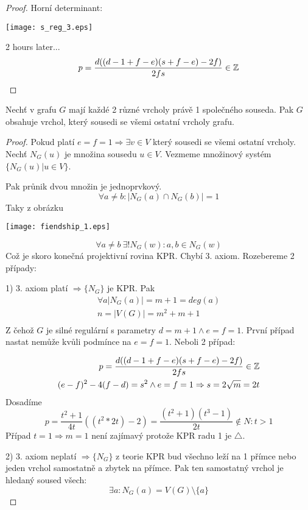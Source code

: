 \begin{proof}
	Horní determinant:

	\texttt{[image: s\_reg\_3.eps]}

	2 hours later...
	\[ p = \frac{d((d - 1 + f - e)(s + f - e) - 2f)}{2fs} \in \operatorname{\mathbb{Z}} \]
\end{proof}

\begin{theorem}
	Nechť v grafu $G$ mají každé 2 různé vrcholy právě 1 společného souseda.
	Pak $G$ obsahuje vrchol, který sousedi se všemi ostatní vrcholy grafu.
\end{theorem}
\begin{proof}
	Pokud platí $ e = f = 1 \Rightarrow \exists v \in V$ který sousedi se všemi ostatní vrcholy. \\
	Nechť $N_G(u)$ je množina sousedu $u \in V$. Vezmeme množinový systém $\{ N_G(u) | u \in V \}$.

	Pak průnik dvou množin je jednoprvkový.
	\[ \forall a \ne b: |N_G(a) \cap N_G(b)| = 1 \]
	Taky z obrázku

	\texttt{[image: fiendship\_1.eps]}

	\[ \forall a \ne b\ \exists! N_G(w): a,b \in N_G(w) \]
	Což je skoro konečná projektivní rovina KPR. Chybí 3. axiom. Rozebereme 2 případy:

	1) 3. axiom platí $\Rightarrow \{N_G\}$ je KPR. Pak
	\begin{equation*}
	\begin{split}
		\forall a |N_G(a)| = m + 1 = deg(a) \\
		n = |V(G)| = m^2 + m + 1\\
	\end{split}
	\end{equation*}
	Z čehož $G$ je silné regulární s parametry $ d = m + 1 \land e = f = 1$. První případ nastat nemůže kvůli podmínce na $e = f = 1$. Neboli 2 případ:

	\begin{equation*}
	\begin{aligned}
		p = \frac{d((d - 1 + f - e)(s + f - e) - 2f)}{2fs} \in \operatorname{\mathbb{Z}} \\
		(e - f)^2 - 4 (f - d) = s^2 \land e = f = 1 \Rightarrow s = 2 \sqrt{m} = 2t
	\end{aligned}
	\end{equation*}
	Dosadíme
	\[ p = \frac{t^2 + 1}{4t}((t^2 * 2t) - 2) = \frac{(t^2 + 1)(t^3 - 1)}{2t} \notin N : t > 1 \]
	Případ $t = 1 \Rightarrow m = 1$ není zajímavý protože KPR radu 1 je $\triangle$.

	2) 3. axiom neplatí $\Rightarrow \{N_G\}$ z teorie KPR bud všechno leží na 1 přímce nebo jeden vrchol samostatně a zbytek na přímce. Pak ten samostatný vrchol je hledaný soused všech:
	\[ \exists a : N_G(a) = V(G)\setminus \{a\} \]

\end{proof}
